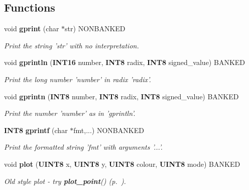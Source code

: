\subsection*{Functions}
\begin{CompactItemize}
\item 
\label{drawing.h_a14}
void {\bf gprint} (char $\ast$str) NONBANKED
\begin{CompactList}\small\item\em Print the string 'str' with no interpretation.\item\end{CompactList}

\item 
void {\bf gprintln} ({\bf INT16} number, {\bf INT8} radix, {\bf INT8} signed\_\-value) BANKED
\begin{CompactList}\small\item\em Print the long number 'number' in radix 'radix'.\item\end{CompactList}

\item 
\label{drawing.h_a16}
void {\bf gprintn} ({\bf INT8} number, {\bf INT8} radix, {\bf INT8} signed\_\-value) BANKED
\begin{CompactList}\small\item\em Print the number 'number' as in 'gprintln'.\item\end{CompactList}

\item 
\label{drawing.h_a17}
{\bf INT8} {\bf gprintf} (char $\ast$fmt,...) NONBANKED
\begin{CompactList}\small\item\em Print the formatted string 'fmt' with arguments '...'.\item\end{CompactList}

\item 
\label{drawing.h_a18}
void {\bf plot} ({\bf UINT8} x, {\bf UINT8} y, {\bf UINT8} colour, {\bf UINT8} mode) BANKED
\begin{CompactList}\small\item\em Old style plot - try {\bf plot\_\-point}() {\rm (p.~\pageref{drawing.h_a19})}.\item\end{CompactList}


\end{CompactItemize}
